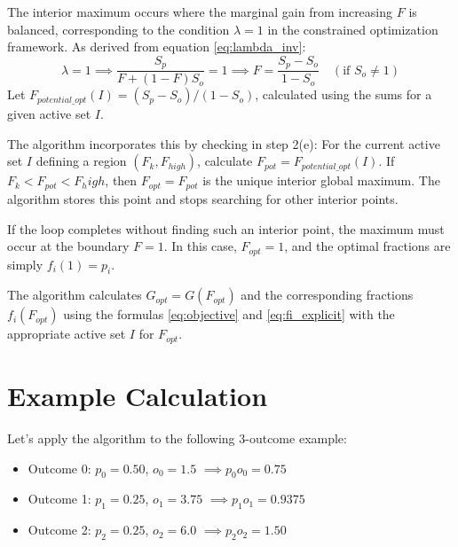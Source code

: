 \documentclass[11pt, letterpaper]{article}
\theoremstyle{definition}
\begin{document}
The interior maximum occurs where the marginal gain from increasing $F$ is balanced, corresponding to the condition $\lambda = 1$ in the constrained optimization framework. As derived from equation \eqref{eq:lambda_inv}:
\begin{equation*}
    \lambda = 1 \implies \frac{S_p}{F + (1 - F) S_o} = 1 \implies F = \frac{S_p - S_o}{1 - S_o} \quad (\text{if } S_o \neq 1)
\end{equation*}
Let $F_{potential\_opt}(I) = (S_p - S_o) / (1 - S_o)$, calculated using the sums for a given active set $I$.

The algorithm incorporates this by checking in step 2(e): For the current active set $I$ defining a region $(F_k, F_{high})$, calculate $F_{pot} = F_{potential\_opt}(I)$. If $F_k < F_{pot} < F_high$, then $F_{opt} = F_{pot}$ is the unique interior global maximum. The algorithm stores this point and stops searching for other interior points.

If the loop completes without finding such an interior point, the maximum must occur at the boundary $F=1$. In this case, $F_{opt}=1$, and the optimal fractions are simply $f_i(1) = p_i$.

The algorithm calculates $G_{opt} = G(F_{opt})$ and the corresponding fractions $f_i(F_{opt})$ using the formulas \eqref{eq:objective} and \eqref{eq:fi_explicit} with the appropriate active set $I$ for $F_{opt}$.

\section{Example Calculation}
\label{sec:example}

Let's apply the algorithm to the following 3-outcome example:
\begin{itemize}
    \item Outcome 0: $p_0=0.50$, $o_0=1.5$  $\implies p_0 o_0 = 0.75$
    \item Outcome 1: $p_1=0.25$, $o_1=3.75$ $\implies p_1 o_1 = 0.9375$
    \item Outcome 2: $p_2=0.25$, $o_2=6.0$  $\implies p_2 o_2 = 1.50$
\end{itemize}
\end{document}
